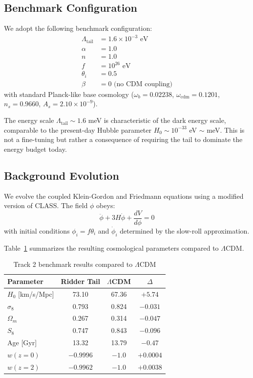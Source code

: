 \subsection{Benchmark Configuration}

We adopt the following benchmark configuration:
\begin{align}
\Lambda_{\text{tail}} &= 1.6 \times 10^{-3} \text{ eV} \\
\alpha &= 1.0 \\
n &= 1.0 \\
f &= 10^{26} \text{ eV} \\
\theta_i &= 0.5 \\
\beta &= 0 \text{ (no CDM coupling)}
\end{align}
with standard Planck-like base cosmology ($\omega_b = 0.02238$, $\omega_{\text{cdm}} = 0.1201$, $n_s = 0.9660$, $A_s = 2.10 \times 10^{-9}$).

The energy scale $\Lambda_{\text{tail}} \sim 1.6$ meV is characteristic of the dark energy scale, comparable to the present-day Hubble parameter $H_0 \sim 10^{-33}$ eV $\sim$ meV. This is not a fine-tuning but rather a consequence of requiring the tail to dominate the energy budget today.

\subsection{Background Evolution}

We evolve the coupled Klein-Gordon and Friedmann equations using a modified version of CLASS. The field $\phi$ obeys:
\begin{equation}
\ddot{\phi} + 3H\dot{\phi} + \frac{dV}{d\phi} = 0
\end{equation}
with initial conditions $\phi_i = f \theta_i$ and $\dot{\phi}_i$ determined by the slow-roll approximation.

Table~\ref{tab:track2_results} summarizes the resulting cosmological parameters compared to $\Lambda$CDM.

\begin{table}[h]
\centering
\caption{Track 2 benchmark results compared to $\Lambda$CDM}
\label{tab:track2_results}
\begin{tabular}{lccc}
\hline
Parameter & Ridder Tail & $\Lambda$CDM & $\Delta$ \\
\hline
$H_0$ [km/s/Mpc] & 73.10 & 67.36 & $+5.74$ \\
$\sigma_8$ & 0.793 & 0.824 & $-0.031$ \\
$\Omega_m$ & 0.267 & 0.314 & $-0.047$ \\
$S_8$ & 0.747 & 0.843 & $-0.096$ \\
Age [Gyr] & 13.32 & 13.79 & $-0.47$ \\
$w(z=0)$ & $-0.9996$ & $-1.0$ & $+0.0004$ \\
$w(z=2)$ & $-0.9962$ & $-1.0$ & $+0.0038$ \\
\hline
\end{tabular}
\end{table}

